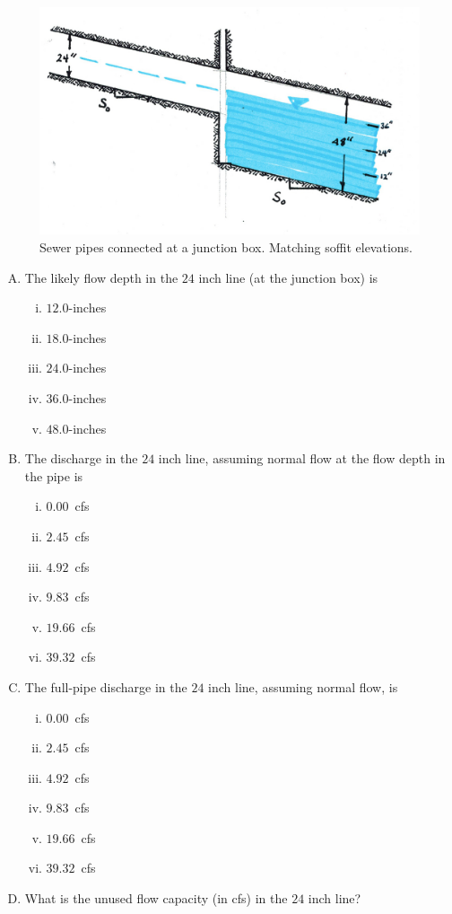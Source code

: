 \documentclass[11pt]{article}
\begin{document}
\begin{enumerate}
\begin{figure}[h!] %
\centering
   \includegraphics[width=4.8in]{SewerPipeMatchSoffit.jpg}
   \caption{Sewer pipes connected at a junction box.  Matching soffit elevations.}
   \label{fig:SewerPipeMatchSoffit} 
\end{figure}

\begin{enumerate}[(A)]
\item The likely flow depth in the $24$ inch line (at the junction box) is
\begin{enumerate} [i)]
\item $12.0$-inches 
\item $18.0$-inches 
\item $24.0$-inches 
\item $36.0$-inches
\item $48.0$-inches
\end{enumerate} 
\item The discharge in the $24$ inch line, assuming normal flow at the flow depth in the pipe is 
\begin{enumerate} [i)]
\item $0.00$~cfs
\item $2.45$~cfs
\item $4.92$~cfs
\item $9.83$~cfs 
\item $19.66$~cfs
\item $39.32$~cfs
\end{enumerate} 
\item The full-pipe discharge in the $24$ inch line, assuming normal flow, is
\begin{enumerate} [i)]
\item $0.00$~cfs
\item $2.45$~cfs
\item $4.92$~cfs
\item $9.83$~cfs 
\item $19.66$~cfs
\item $39.32$~cfs
\end{enumerate} 
\item What is the unused flow capacity (in cfs)  in the $24$ inch line? ~\\ ~\\
\end{enumerate}



\end{enumerate}
\end{document}
